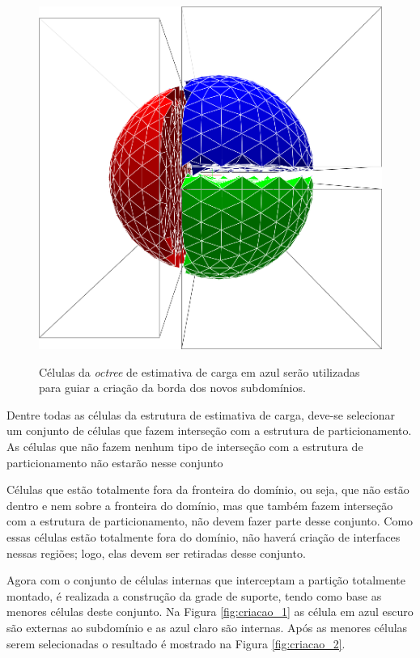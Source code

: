 \begin{figure}[!ht]
{		\begin{minipage}[c]{0.45\textwidth}{\includegraphics[width=\textwidth]{fig/esfera3.png}}\end{minipage}
	}
	\caption{Células da \textit{octree} de estimativa de carga em azul serão utilizadas para guiar a criação da borda dos novos subdomínios.}
	\label{fig:celulas_selecionadas3d}
\end{figure}


Dentre todas as células da estrutura de estimativa de carga, deve-se selecionar um conjunto de células que fazem interseção com a estrutura de particionamento. As células que não fazem nenhum tipo de interseção com a estrutura de particionamento não estarão nesse conjunto

Células que estão totalmente fora da fronteira do domínio, ou seja, que não estão dentro e nem sobre a fronteira do domínio, mas que também fazem interseção com a estrutura de particionamento, não devem fazer parte desse conjunto. Como essas células estão totalmente fora do domínio, não haverá criação de interfaces nessas regiões; logo, elas devem ser retiradas desse conjunto.

Agora com o conjunto de células internas que interceptam a partição totalmente montado, é realizada a construção da grade de suporte, tendo como base as menores células deste conjunto. Na Figura \ref{fig:criacao_1} as célula em azul escuro são externas ao subdomínio e as azul claro são internas. Após as menores células serem selecionadas o resultado é mostrado na Figura \ref{fig:criacao_2}.


